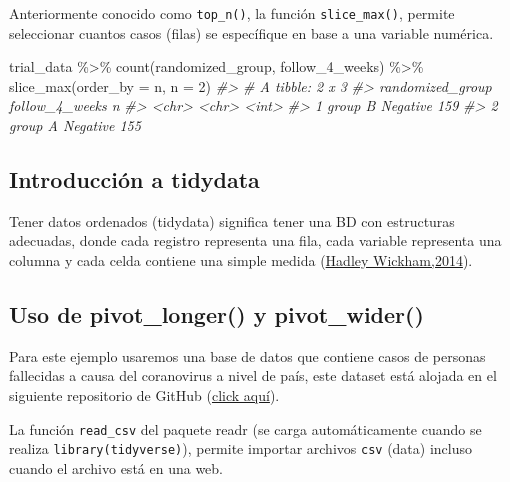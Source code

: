 \documentclass[
]{book}
\newenvironment{Shaded}{\begin{snugshade}}{\end{snugshade}}
\newcommand{\AttributeTok}[1]{\textcolor[rgb]{0.77,0.63,0.00}{#1}}
\newcommand{\CommentTok}[1]{\textcolor[rgb]{0.56,0.35,0.01}{\textit{#1}}}
\newcommand{\DecValTok}[1]{\textcolor[rgb]{0.00,0.00,0.81}{#1}}
\newcommand{\FunctionTok}[1]{\textcolor[rgb]{0.00,0.00,0.00}{#1}}
\newcommand{\NormalTok}[1]{#1}
\newcommand{\SpecialCharTok}[1]{\textcolor[rgb]{0.00,0.00,0.00}{#1}}
\begin{document}
Anteriormente conocido como \texttt{top\_n()}, la función \texttt{slice\_max()}, permite seleccionar cuantos casos (filas) se específique en base a una variable numérica.

\begin{Shaded}
\begin{Highlighting}[]
\NormalTok{trial\_data }\SpecialCharTok{\%\textgreater{}\%}
  \FunctionTok{count}\NormalTok{(randomized\_group,}
\NormalTok{        follow\_4\_weeks) }\SpecialCharTok{\%\textgreater{}\%}
  \FunctionTok{slice\_max}\NormalTok{(}\AttributeTok{order\_by =}\NormalTok{ n,}
            \AttributeTok{n =} \DecValTok{2}\NormalTok{)}
\CommentTok{\#\textgreater{} \# A tibble: 2 x 3}
\CommentTok{\#\textgreater{}   randomized\_group follow\_4\_weeks     n}
\CommentTok{\#\textgreater{}   \textless{}chr\textgreater{}            \textless{}chr\textgreater{}          \textless{}int\textgreater{}}
\CommentTok{\#\textgreater{} 1 group B          Negative         159}
\CommentTok{\#\textgreater{} 2 group A          Negative         155}
\end{Highlighting}
\end{Shaded}

\hypertarget{introducciuxf3n-a-tidydata}{%
\subsection{Introducción a tidydata}\label{introducciuxf3n-a-tidydata}}

Tener datos ordenados (tidydata) significa tener una BD con estructuras adecuadas, donde cada registro representa una fila, cada variable representa una columna y cada celda contiene una simple medida (\href{https://www.jstatsoft.org/article/view/v059i10}{Hadley Wickham,2014}).

\hypertarget{uso-de-pivot_longer-y-pivot_wider}{%
\subsection{Uso de pivot\_longer() y pivot\_wider()}\label{uso-de-pivot_longer-y-pivot_wider}}

Para este ejemplo usaremos una base de datos que contiene casos de personas fallecidas a causa del coranovirus a nivel de país, este dataset está alojada en el siguiente repositorio de GitHub (\href{https://github.com/CSSEGISandData/COVID-19}{click aquí}).

La función \texttt{read\_csv} del paquete readr (se carga automáticamente cuando se realiza \texttt{library(tidyverse)}), permite importar archivos \texttt{csv} (data) incluso cuando el archivo está en una web.
\end{document}
